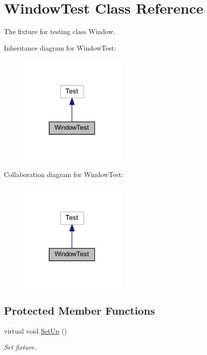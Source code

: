 \hypertarget{class_window_test}{}\section{Window\+Test Class Reference}
\label{class_window_test}


The fixture for testing class Window.  




Inheritance diagram for Window\+Test\+:
\nopagebreak
\begin{figure}[H]
\begin{center}
\leavevmode
\includegraphics[width=150pt]{class_window_test__inherit__graph}
\end{center}
\end{figure}


Collaboration diagram for Window\+Test\+:
\nopagebreak
\begin{figure}[H]
\begin{center}
\leavevmode
\includegraphics[width=150pt]{class_window_test__coll__graph}
\end{center}
\end{figure}
\subsection*{Protected Member Functions}
\begin{DoxyCompactItemize}
\item 
\hypertarget{class_window_test_aef877f3405cf0e40a8c7e81fe47c3a7a}{}\label{class_window_test_aef877f3405cf0e40a8c7e81fe47c3a7a} 
virtual void \hyperlink{class_window_test_aef877f3405cf0e40a8c7e81fe47c3a7a}{Set\+Up} ()
\begin{DoxyCompactList}\small\item\em Set fixture. \end{DoxyCompactList}\end{DoxyCompactItemize}
